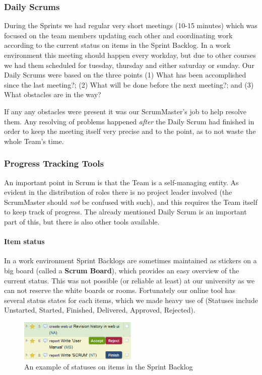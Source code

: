 \subsubsection{Daily Scrums}
During the Sprints we had regular very short meetings (10-15 minutes) which was focused on the team members updating each other and coordinating work according to the current status on items in the Sprint Backlog. In a work environment this meeting should happen every workday, but due to other courses we had them scheduled for tuesday, thursday and either saturday or sunday. Our Daily Scrums were based on the three points (1) What has been accomplished since the last meeting?; (2) What will be done before the next meeting?; and (3) What obstacles are in the way?

If any any obstacles were present it was our ScrumMaster's job to help resolve them. Any resolving of problems happened \emph{after} the Daily Scrum had finished in order to keep the meeting itself very precise and to the point, as to not waste the whole Team's time.


\subsubsection{Progress Tracking Tools}
An important point in Scrum is that the Team is a self-managing entity. As evident in the distribution of roles there is no project leader involved (the ScrumMaster should \emph{not} be confused with such), and this requires the Team itself to keep track of progress. The already mentioned Daily Scrum is an important part of this, but there is also other tools available.

\paragraph{Item status}
In a work environment Sprint Backlogs are sometimes maintained as stickers on a big board (called a \textbf{Scrum Board}), which provides an easy overview of the current status. This was not possible (or reliable at least) at our university as we can not reserve the white boards or rooms. Fortunately our online tool has several status states for each items, which we made heavy use of (Statuses include Unstarted, Started, Finished, Delivered, Approved, Rejected).
\begin{figure}[htb]
	\centering
	\includegraphics[width=0.50\textwidth]{SCRUM/graphics/status-example.png}
	\caption{An example of statuses on items in the Sprint Backlog}
	\label{fig:item-status}
\end{figure}

